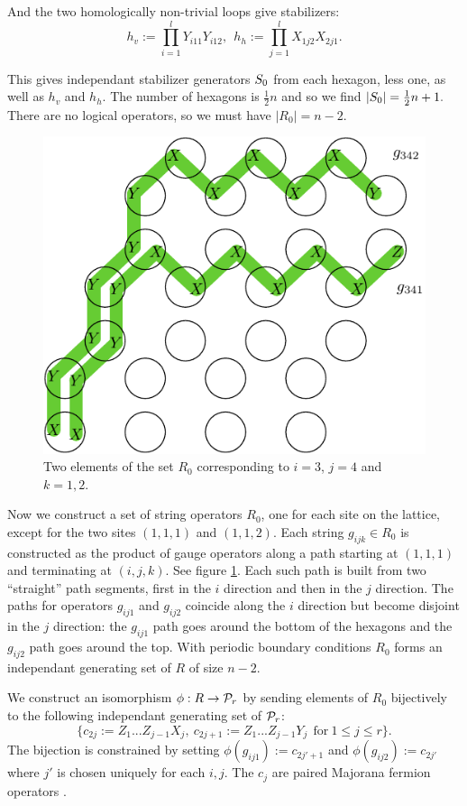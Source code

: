 \documentclass[12pt,notitlepage,longbibliography,nofootinbib,tightenlines]{revtex4}
\begin{document}
And the two homologically non-trivial loops
give stabilizers:
$$
h_v := \prod_{i=1}^l Y_{i11} Y_{i12},\ \ 
h_h := \prod_{j=1}^l X_{1j2} X_{2j1}.
$$

This gives independant stabilizer generators $S_0$
from each hexagon, less one, as well as $h_v$ and $h_h.$
The number of hexagons is $\frac{1}{2}n$ and
so we find $|S_0|=\frac{1}{2} n+1.$
There are no logical operators, so we
must have $|R_0|=n-2.$

\begin{figure}[th!]
\begin{center}
        \includegraphics[width=0.5\columnwidth]{fig_01.pdf}
\caption{Two elements of the set $R_0$ corresponding
to $i=3$, $j=4$ and $k=1,2.$}
\label{jaws}
\end{center}
\end{figure}

Now we construct a set of string operators $R_0$,
one for each site on the lattice, except for
the two sites $(1,1,1)$ and $(1,1,2).$
Each string $g_{ijk}\in R_0$
is constructed as the product of
gauge operators along a path starting at
$(1,1,1)$ and terminating at $(i,j,k).$
See figure \ref{jaws}.
Each such path is built from two ``straight''
path segments, first in the $i$ direction
and then in the $j$ direction. 
The paths for operators $g_{ij1}$ and
$g_{ij2}$ coincide along the $i$ direction
but become disjoint in the $j$ direction:
the $g_{ij1}$ path goes around the bottom
of the hexagons and the $g_{ij2}$ path
goes around the top.
With periodic boundary conditions $R_0$ forms an
independant generating set of $R$ of size $n-2.$

We construct an isomorphism $\phi: R\to \mathcal{P}_r$
by sending elements of $R_0$ bijectively
to the following independant generating
set of $\mathcal{P}_r$:
$$
\big\{c_{2j}:=Z_1...Z_{j-1} X_j,\ c_{2j+1}:=Z_1...Z_{j-1} Y_j\ \ \mbox{for}\ 1\le j\le r\big\}.
$$
The bijection is constrained 
by setting $\phi(g_{ij1}):=c_{2j'+1}$
and $\phi(g_{ij2}):=c_{2j'}$
where $j'$ is chosen uniquely for each $i, j.$
The $c_j$ are paired Majorana fermion operators \cite{Kitaev2006}.
\end{document}
